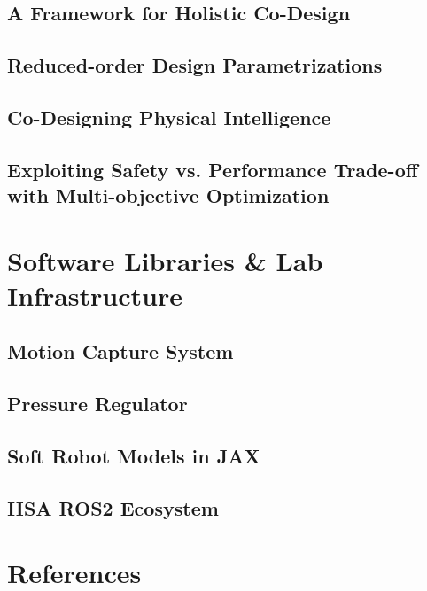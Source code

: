 \documentclass{dissertation}
\begin{document}
\section{A Framework for Holistic Co-Design}
\section{Reduced-order Design Parametrizations}
\section{Co-Designing Physical Intelligence}
\section{Exploiting Safety vs. Performance Trade-off with Multi-objective Optimization}

\chapter{Software Libraries \& Lab Infrastructure}
\section{Motion Capture System}
\section{Pressure Regulator}
\section{Soft Robot Models in JAX}
\section{HSA ROS2 Ecosystem}


\thumbfalse

\chapter*{References}


% 
% 
% 




\printabbreviations[title={Abbreviations}]

% 


\end{document}
